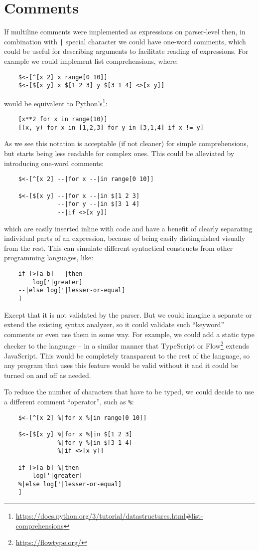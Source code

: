\section{Comments}\label{sec:comments}
If multiline comments were implemented as expressions on parser-level then, in combination with \texttt{|} special character we could have one-word comments, which could be useful for describing arguments to facilitate reading of expressions. For example we could implement list comprehensions, where:
\begin{lstlisting}
    $<-[^[x 2] x range[0 10]]
    $<-[$[x y] x $[1 2 3] y $[3 1 4] <>[x y]]
\end{lstlisting}
would be equivalent to Python's\footnote{\url{https://docs.python.org/3/tutorial/datastructures.html\#list-comprehensions}}:
\begin{lstlisting}
    [x**2 for x in range(10)]
    [(x, y) for x in [1,2,3] for y in [3,1,4] if x != y]
\end{lstlisting}
As we see this notation is acceptable (if not cleaner) for simple comprehensions, but starts being less readable for complex ones. This could be alleviated by introducing one-word comments:
\begin{lstlisting}
    $<-[^[x 2] --|for x --|in range[0 10]]
    
    $<-[$[x y] --|for x --|in $[1 2 3]
               --|for y --|in $[3 1 4]
               --|if <>[x y]]
\end{lstlisting}
which are easily inserted inline with code and have a benefit of clearly separating individual parts of an expression, because of being easily distinguished visually from the rest. This can simulate different syntactical constructs from other programming languages, like:
\begin{lstlisting}
    if [>[a b] --|then
        log['|greater]
    --|else log['|lesser-or-equal]
    ]
\end{lstlisting}
Except that it is not validated by the parser. But we could imagine a separate or extend the existing syntax analyzer, so it could validate such ``keyword'' comments or even use them in some way. For example, we could add a static type checker to the language -- in a similar manner that TypeScript or Flow\footnote{\url{https://flowtype.org/}} extends JavaScript. This would be completely transparent to the rest of the language, so any program that uses this feature would be valid without it and it could be turned on and off as needed.

To reduce the number of characters that have to be typed, we could decide to use a different comment ``operator'', such as \texttt{\%}:
\begin{lstlisting}
    $<-[^[x 2] %|for x %|in range[0 10]]
    
    $<-[$[x y] %|for x %|in $[1 2 3]
               %|for y %|in $[3 1 4]
               %|if <>[x y]]

    if [>[a b] %|then
        log['|greater]
    %|else log['|lesser-or-equal]
    ]
\end{lstlisting}


